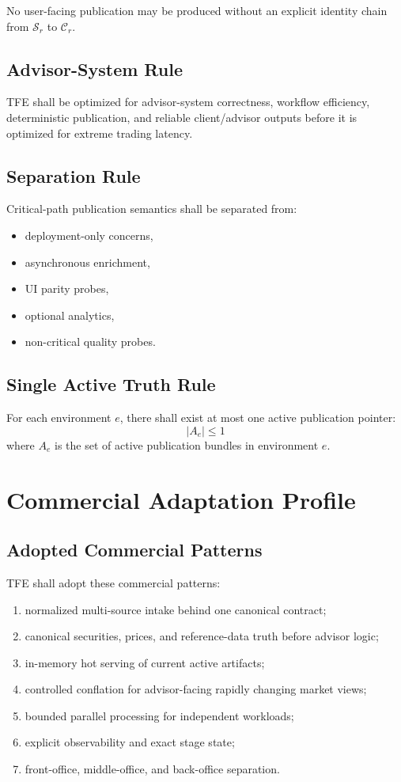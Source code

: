 \documentclass[11pt]{report}
\begin{document}
No user-facing publication may be produced without an explicit identity chain from \(\mathcal{S}_r\) to \(\mathcal{C}_r\).

\section{Advisor-System Rule}
TFE shall be optimized for advisor-system correctness, workflow efficiency, deterministic publication, and reliable client/advisor outputs before it is optimized for extreme trading latency.

\section{Separation Rule}
Critical-path publication semantics shall be separated from:
\begin{itemize}
    \item deployment-only concerns,
    \item asynchronous enrichment,
    \item UI parity probes,
    \item optional analytics,
    \item non-critical quality probes.
\end{itemize}

\section{Single Active Truth Rule}
For each environment \(e\), there shall exist at most one active publication pointer:
\[
\left| A_e \right| \le 1
\]
where \(A_e\) is the set of active publication bundles in environment \(e\).

\chapter{Commercial Adaptation Profile}
\section{Adopted Commercial Patterns}
TFE shall adopt these commercial patterns:
\begin{enumerate}[leftmargin=1.2cm]
    \item normalized multi-source intake behind one canonical contract;
    \item canonical securities, prices, and reference-data truth before advisor logic;
    \item in-memory hot serving of current active artifacts;
    \item controlled conflation for advisor-facing rapidly changing market views;
    \item bounded parallel processing for independent workloads;
    \item explicit observability and exact stage state;
    \item front-office, middle-office, and back-office separation.
\end{enumerate}
\end{document}
